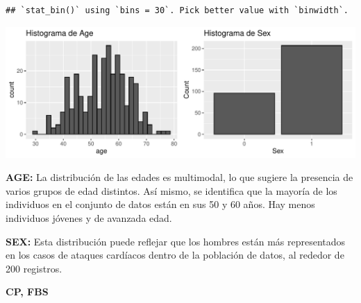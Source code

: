 \documentclass[
]{article}
\begin{document}
\begin{verbatim}
## `stat_bin()` using `bins = 30`. Pick better value with `binwidth`.
\end{verbatim}

\includegraphics{coyolaf_ChristianOyola-PRA2_files/figure-latex/unnamed-chunk-9-1.pdf}

\textbf{AGE:} La distribución de las edades es multimodal, lo que
sugiere la presencia de varios grupos de edad distintos. Así mismo, se
identifica que la mayoría de los individuos en el conjunto de datos
están en sus 50 y 60 años. Hay menos individuos jóvenes y de avanzada
edad.

\textbf{SEX:} Esta distribución puede reflejar que los hombres están más
representados en los casos de ataques cardíacos dentro de la población
de datos, al rededor de 200 registros.

\textbf{CP, FBS}
\end{document}
